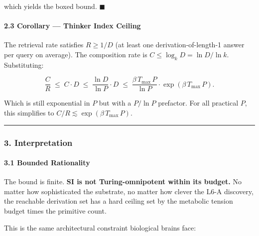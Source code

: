 \documentclass[
  11pt,
  a4paper,
]{article}
\begin{document}
which yields the boxed bound. \(\blacksquare\)

\paragraph{2.3 Corollary --- Thinker Index
Ceiling}\label{corollary-thinker-index-ceiling}

The retrieval rate satisfies \(R \geq 1/D\) (at least one
derivation-of-length-1 answer per query on average). The composition
rate is \(C \leq \log_k D = \ln D / \ln k\). Substituting:

\[
\frac{C}{R} \;\leq\; C \cdot D \;\leq\; \frac{\ln D}{\ln P} \cdot D \;\leq\; \frac{\beta \, T_\text{max} \, P}{\ln P} \cdot \exp(\beta \, T_\text{max} \, P).
\]

Which is still exponential in \(P\) but with a \(P/\ln P\) prefactor.
For all practical \(P\), this simplifies to
\(C/R \lesssim \exp(\beta \, T_\text{max} \, P)\).

\begin{center}\rule{0.5\linewidth}{0.5pt}\end{center}

\subsubsection{3. Interpretation}\label{interpretation-1}

\paragraph{3.1 Bounded Rationality}\label{bounded-rationality}

The bound is finite. \textbf{SI is not Turing-omnipotent within its
budget.} No matter how sophisticated the substrate, no matter how clever
the L6-A discovery, the reachable derivation set has a hard ceiling set
by the metabolic tension budget times the primitive count.

This is the same architectural constraint biological brains face:
\end{document}
